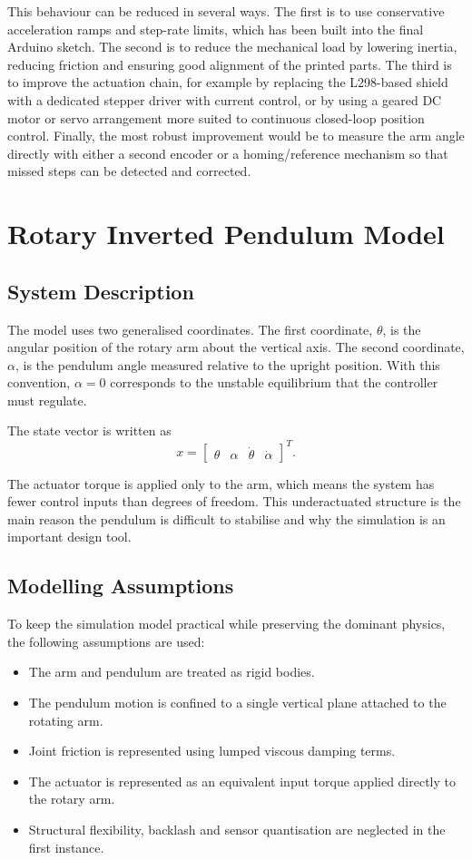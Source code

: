 \documentclass[conference]{IEEEtran}
\begin{document}
This behaviour can be reduced in several ways. The first is to use conservative acceleration ramps and step-rate limits, which has been built into the final Arduino sketch. The second is to reduce the mechanical load by lowering inertia, reducing friction and ensuring good alignment of the printed parts. The third is to improve the actuation chain, for example by replacing the L298-based shield with a dedicated stepper driver with current control, or by using a geared DC motor or servo arrangement more suited to continuous closed-loop position control. Finally, the most robust improvement would be to measure the arm angle directly with either a second encoder or a homing/reference mechanism so that missed steps can be detected and corrected.

\section{Rotary Inverted Pendulum Model}
\subsection{System Description}
The model uses two generalised coordinates. The first coordinate, $\theta$, is the angular position of the rotary arm about the vertical axis. The second coordinate, $\alpha$, is the pendulum angle measured relative to the upright position. With this convention, $\alpha = 0$ corresponds to the unstable equilibrium that the controller must regulate.

The state vector is written as
\begin{equation}
x =
\begin{bmatrix}
\theta & \alpha & \dot{\theta} & \dot{\alpha}
\end{bmatrix}^{T}.
\end{equation}

The actuator torque is applied only to the arm, which means the system has fewer control inputs than degrees of freedom. This underactuated structure is the main reason the pendulum is difficult to stabilise and why the simulation is an important design tool.

\subsection{Modelling Assumptions}
To keep the simulation model practical while preserving the dominant physics, the following assumptions are used:
\begin{itemize}
\item The arm and pendulum are treated as rigid bodies.
\item The pendulum motion is confined to a single vertical plane attached to the rotating arm.
\item Joint friction is represented using lumped viscous damping terms.
\item The actuator is represented as an equivalent input torque applied directly to the rotary arm.
\item Structural flexibility, backlash and sensor quantisation are neglected in the first instance.
\end{itemize}
\end{document}
